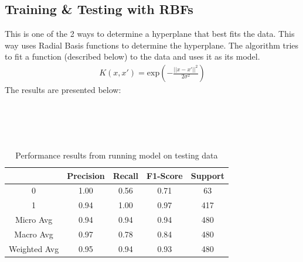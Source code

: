 \documentclass[a4paper,titlepage]{article}
\begin{document}
	\subsection{Training \& Testing with RBFs}
	This is one of the 2 ways to determine a hyperplane that best fits the data. This way uses Radial Basis functions to determine the hyperplane. The algorithm tries to fit a function (described below) to the data and uses it as its model.
	\begin{align}
		K(x, x')=\text{exp}\left(-\frac{||x-x'||^2}{2\sigma^2}\right)
	\end{align}
	The results are presented below:\\\\\\\\\\
	\begin{table}[h]
		\centering
		\begin{tabular}{||c||c c c c||}
			\hline
			& \textbf{Precision} & \textbf{Recall} & \textbf{F1-Score} & \textbf{Support}\\
			\hline
			\hline
			0 & 1.00 & 0.56 & 0.71 & 63\\
			1 & 0.94 & 1.00 & 0.97 & 417\\
			\hline
			\hline
			Micro Avg & 0.94 & 0.94 & 0.94 & 480\\
			Macro Avg & 0.97 & 0.78 & 0.84 & 480\\
			Weighted Avg & 0.95 & 0.94 & 0.93 & 480\\
			\hline
		\end{tabular}
		\caption{Performance results from running model on testing data}
		\label{rbfsvmresults}
	\end{table}
\end{document}
